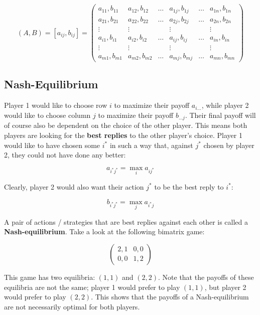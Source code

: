 \documentclass[12pt]{article}
\begin{document}
\[ (A, B) = [a_{ij}, b_{ij}] = \begin{pmatrix}
    a_{11}, b_{11} & a_{12}, b_{12} & \dots & a_{1j}, b_{1j} & \dots & a_{1n}, b_{1n} \\
    a_{21}, b_{21} & a_{22}, b_{22} & \dots & a_{2j}, b_{2j} & \dots & a_{2n}, b_{2n} \\
    \vdots & \vdots & & \vdots & & \vdots \\
    a_{i1}, b_{i1} & a_{i2}, b_{i2} & \dots & a_{ij}, b_{ij} & \dots & a_{in}, b_{in} \\
    \vdots & \vdots & & \vdots & & \vdots \\
    a_{m1}, b_{m1} & a_{m2}, b_{m2} & \dots & a_{mj}, b_{mj} & \dots & a_{mn}, b_{mn}
\end{pmatrix} \]

\subsection{Nash-Equilibrium}
Player 1 would like to choose row $i$ to maximize their payoff $a_{i\dots}$, while player 2 would like to choose column $j$ to maximize their payoff $b_{\dots j}$.
Their final payoff will of course also be dependent on the choice of the other player.
This means both players are looking for the \textbf{best replies} to the other player's choice.
Player 1 would like to have chosen some $i^*$ in such a way that, against $j^*$ chosen by player 2, they could not have done any better:

\[ a_{i^* j^*} = \max_i a_{ij^*} \]

\noindent
Clearly, player 2 would also want their action $j^*$ to be the best reply to $i^*$:

\[ b_{i^* j^*} = \max_j a_{i^*j} \]

\noindent
A pair of actions / strategies that are best replies against each other is called a \textbf{Nash-equilibrium}.
Take a look at the following bimatrix game:

\[ \begin{pmatrix}
    2,1 & 0,0 \\
    0,0 & 1,2
\end{pmatrix} \]

\noindent
This game has two equilibria: $(1, 1)$ and $(2, 2)$.
Note that the payoffs of these equilibria are not the same; player 1 would prefer to play $(1, 1)$, but player 2 would prefer to play $(2, 2)$.
This shows that the payoffs of a Nash-equilibrium are not necessarily optimal for both players.
\end{document}
